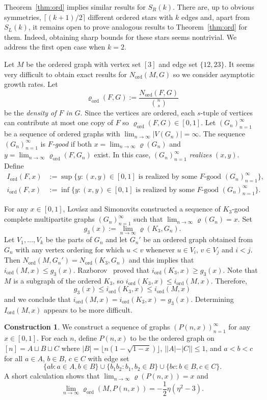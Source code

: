 \documentclass[11pt]{article}
\newcommand{\ord}{{\operatorname{ord}}}
\theoremstyle{definition}
\newtheorem{cons}[thm]{Construction}
\begin{document}
Theorem~\ref{thm:ord} implies similar results for $S_R(k)$. There are, up to obvious symmetries, $\lceil(k+1)/2\rceil$ different ordered stars with $k$ edges and, apart from $S_L(k)$,  it remains open to prove analogous results to Theorem~\ref{thm:ord} for them.  Indeed, obtaining sharp bounds for these stars seems nontrivial. We address the first open case when $k=2$.

Let $M$ be  the ordered graph with vertex set $[3]$ and edge set $\{12, 23\}$. It seems very difficult to obtain exact results for $N_\ord(M, G)$ so we consider asymptotic growth rates.
Let \[\varrho_\ord (F, G) := \frac{N_{\ord} (F, G) }{ \binom{n}{s}}\]
be the {\em density of $F$ in $G$}. Since the vertices are ordered, each $s$-tuple of vertices can contribute at most one copy of $F$ so $\varrho_\ord (F, G)  \in [0,1]$. Let $(G_n)_{n=1}^\infty$ be a sequence of ordered graphs with $\lim_{n \to \infty} |V(G_n)| = \infty$. The sequence $(G_n)_{n=1}^\infty$ is {\em $F$-good} if both  $x = \lim_{n \to \infty} \varrho (G_n)$  and $y = \lim_{n\to \infty} \varrho_\ord (F, G_n)$ exist. In this case, $(G_n)_{n=1}^\infty$ {\em realizes} $(x,y)$. Define \begin{align*}
    I_{\ord} (F, x) &:= \sup \{ y : (x,y) \in [0,1] \text{ is realized by some $F$-good } (G_n)_{n=1}^\infty \}, \\
    i_{\ord} (F, x) &:= \inf \{ y : (x,y) \in [0,1] \text{ is realized by some $F$-good } (G_n)_{n=1}^\infty \}.
\end{align*}

For any $x\in [0,1]$, Lov\'{a}sz and Simonovits \cite{LS}  constructed a sequence of $K_3$-good complete multipartite graphs $(G_n)_{n=1}^\infty$ such that $\lim_{n \to \infty} \varrho (G_n) = x$. Set 
\[g_3(x):= \lim_{n \to \infty}\varrho (K_3, G_n).\]
Let $V_1, \ldots, V_k$ be the parts of $G_n$ and let $G_n'$ be an ordered graph obtained from $G_n$ with any vertex ordering for which $u<v$ whenever $u \in V_i$, $v \in V_j$ and $i<j$. Then
$N_\ord (M, G_n') = N_\ord (K_3, G_n)$ and this implies that
$i_\ord(M, x) \le g_3(x)$.
Razborov~\cite{Raz} proved that $i_\ord (K_3, x) \ge g_3 (x)$. Note that $M$ is a subgraph of the ordered $K_3$, so $i_\ord(K_3, x) \le i_\ord(M, x)$.  Therefore,
\[g_3(x) \le i_\ord(K_3, x) \le i_\ord(M, x)\] 
and we conclude that $i_\ord (M, x) = i_\ord (K_3, x) = g_3 (x)$. Determining $I_{\ord} (M, x)$ appears to be more difficult.

\begin{cons}\label{cons:spider}
    We construct a sequence of graphs $(P(n,x))_{n = 1}^\infty$ for any $x \in [0,1]$. For each $n$, define $P (n, x)$ to be the ordered graph on $[n] = A \sqcup B \sqcup C$ where $|B| = \lfloor n (1 - \sqrt{1 - x})  \rfloor$, $||A|-|C||\le 1$, and $a < b < c$ for all $a \in A$, $b\in B$, $c\in C$ with edge set \[ \{ ab : a \in A, b \in B \} \cup \{ b_1 b_2 : b_1, b_2 \in B \} \cup \{ bc : b \in B, c \in C \} .\] A short calculation shows that $\lim_{n \to \infty} \varrho ( P(n, x)) = x$ and 
    \[\lim_{n \to \infty} \varrho_\ord (M, P(n, x)) = - \frac{1}{2} \eta (\eta^2 - 3).\]
\end{cons}
\end{document}
